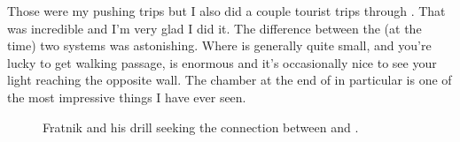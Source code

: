 Those were my pushing trips but I also did a couple tourist trips through . That was incredible and I’m very glad I did it. The difference between the (at the time) two systems was astonishing. Where  is generally quite small, and you’re lucky to get walking passage,  is enormous and it's occasionally nice to see your light reaching the opposite wall. The chamber at the end of  in particular is one of the most impressive things I have ever seen.


\begin{figure}
\checkoddpage \ifoddpage \forcerectofloat \else \forceversofloat \fi
\centering
 \caption{Fratnik and his drill seeking the connection between  and . }
 \label{m2 drill}
\end{figure}



